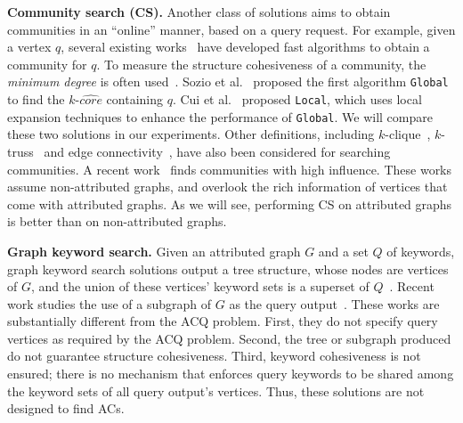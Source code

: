 \textbf{Community search (CS).}  Another class of solutions aims to obtain communities in an ``online'' manner, based on a query request. For example, given a vertex $q$, several existing works~\cite{KDD2010,local2014,vldb2015,online-sigmod2013,k-truss2014} have developed fast algorithms to obtain a community for $q$.
To measure the structure cohesiveness of a community, the {\it minimum degree} is often used~\cite{KDD2010,local2014,vldb2015}. Sozio et al.~\cite{KDD2010} proposed the first algorithm {\tt Global} to find the $k$-$\widehat{core}$ containing $q$.
Cui et al.~\cite{local2014} proposed {\tt Local}, which uses local expansion techniques to enhance the performance of {\tt Global}. We will compare these two solutions in our experiments.
Other definitions, including $k$-clique~\cite{online-sigmod2013}, $k$-truss~\cite{k-truss2014} and edge connectivity~\cite{hu2016querying}, have also been considered for searching communities. A recent work~\cite{vldb2015} finds communities with high influence.  These works assume non-attributed graphs, and overlook the rich information of vertices that come with attributed graphs. As we will see, performing CS on attributed graphs is better than on non-attributed graphs.

\textbf{Graph keyword search.}  Given an attributed graph $G$ and a set $Q$ of keywords, graph keyword search solutions output a tree structure, whose nodes are vertices of $G$, and the union of these vertices' keyword sets is a superset of $Q$~\cite{keyword-icde2002,keyword-icde2007,keyword-vldb2005}. Recent work studies the use of a subgraph of $G$ as the query output~\cite{keyword-vldb2011}. These works are substantially different from the ACQ problem. First, they do not specify query vertices as required by the ACQ problem. Second, the tree or subgraph produced do not guarantee structure cohesiveness. Third, keyword cohesiveness is not ensured; there is no mechanism that enforces query keywords to be shared among the keyword sets of all query output's vertices. Thus, these solutions are not designed to find ACs.



